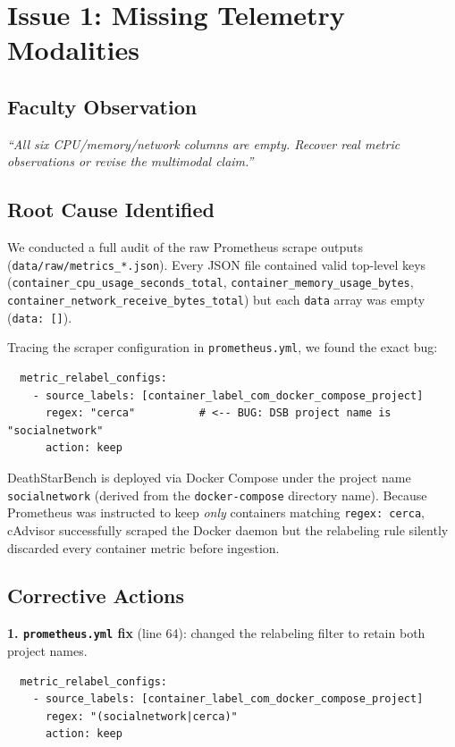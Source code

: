 \documentclass[11pt,a4paper]{article}
\begin{document}
\section{Issue 1: Missing Telemetry Modalities}

\subsection{Faculty Observation}
\textit{``All six CPU/memory/network columns are empty. Recover real metric observations or revise the multimodal claim.''}

\subsection{Root Cause Identified}
We conducted a full audit of the raw Prometheus scrape outputs (\texttt{data/raw/metrics\_*.json}). Every JSON file contained valid top-level keys (\texttt{container\_cpu\_usage\_seconds\_total}, \texttt{container\_memory\_usage\_bytes}, \texttt{container\_network\_receive\_bytes\_total}) but each \texttt{data} array was empty (\texttt{data: []}).

Tracing the scraper configuration in \texttt{prometheus.yml}, we found the exact bug:

\begin{verbatim}
  metric_relabel_configs:
    - source_labels: [container_label_com_docker_compose_project]
      regex: "cerca"          # <-- BUG: DSB project name is "socialnetwork"
      action: keep
\end{verbatim}

DeathStarBench is deployed via Docker Compose under the project name \texttt{socialnetwork} (derived from the \texttt{docker-compose} directory name). Because Prometheus was instructed to keep \emph{only} containers matching \texttt{regex: cerca}, cAdvisor successfully scraped the Docker daemon but the relabeling rule silently discarded every container metric before ingestion.

\subsection{Corrective Actions}

\textbf{1. \texttt{prometheus.yml} fix} (line 64): changed the relabeling filter to retain both project names.
\begin{verbatim}
  metric_relabel_configs:
    - source_labels: [container_label_com_docker_compose_project]
      regex: "(socialnetwork|cerca)"
      action: keep
\end{verbatim}
\end{document}
